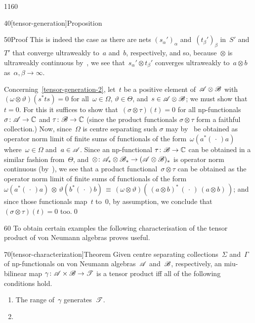 \begin{parsec}{1160}
\begin{point}{40}[tensor-generation]{Proposition}
\begin{point}{50}{Proof}
This is indeed the case
as there are nets $(s_\alpha')_\alpha$
and~$(t_\beta')_\beta$ in~$S'$ and~$T'$
that converge ultraweakly to~$a$ and~$b$, respectively,
and so, 
because~$\otimes$ is ultraweakly continuous by~,
we see that~$s_\alpha'\otimes t_\beta'$
converges ultraweakly to~$a\otimes b$
as~$\alpha,\beta\to\infty$.

Concerning~\ref{tensor-generation-2},
let~$t$ be a positive element of~$\mathscr{A}\otimes \mathscr{B}$
with $(\omega\otimes \vartheta)(s^*ts)=0$
for all~$\omega\in\Omega$, $\vartheta\in\Theta$,
and~$s\in\mathscr{A}\otimes \mathscr{B}$;
we must show that~$t=0$.
For this it suffices
to show that~$(\sigma\otimes\tau)(t)=0$
for all np-functionals  $\sigma\colon \mathscr{A}\to\mathbb{C}$
and 
$\tau\colon\mathscr{B}\to\mathbb{C}$
(since the product functionals $\sigma\otimes\tau$
	form a faithful collection.)
Now, since~$\Omega$ is centre separating
such $\sigma$ may by~ be obtained
as operator norm limit of finite sums
of functionals of the
form~$\omega(a^*(\,\cdot\,)a)$
where~$\omega\in\Omega$ and~$a \in\mathscr{A}$.
Since an np-functional $\tau\colon \mathscr{B}\to\mathbb{C}$ 
can be obtained in a similar fashion
from~$\Theta$,
and~$\otimes \colon \mathscr{A}_*\otimes \mathscr{B}_*\to(\mathscr{A}\otimes\mathscr{B})_*$
is operator norm continuous (by~),
we see that a product functional~$\sigma\otimes \tau$
can be obtained as the operator norm limit
of finite sums of functionals
of the form $\omega(a^*(\,\cdot\,)a)\,\otimes\,
\vartheta(b^*(\,\cdot\,)b)
\,\equiv\, (\omega\otimes\vartheta)(\,(a\otimes b)^*\,(\,\cdot\,)
\,(a\otimes b)\,)$;
and since those functionals 
map~$t$ to~$0$,
by assumption,
we conclude that~$(\sigma\otimes \tau)(t)=0$ too.\qed
\end{point}
\end{point}
\begin{point}{60}%
To obtain certain examples
the following characterisation of
the tensor product of von Neumann algebras
proves useful.
\end{point}
\begin{point}{70}[tensor-characterization]{Theorem}%
Given centre separating collections~$\Sigma$ and~$\Gamma$
of np-functionals
on von Neumann algebras~$\mathscr{A}$ and~$\mathscr{B}$,
respectively,
an miu-bilinear map
$\gamma\colon \mathscr{A}\times\mathscr{B}\to\mathscr{T}$
is a tensor product iff all of the following conditions hold.
\begin{enumerate}
\item
The range of~$\gamma$ generates~$\mathscr{T}$.
\item

\end{enumerate}
\end{point}
\end{parsec}
